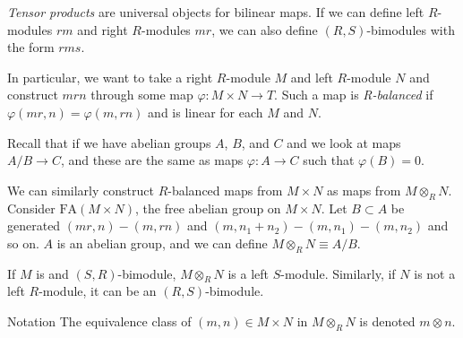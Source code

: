 \documentclass[a4paper,twoside,master.tex]{subfiles}
\begin{document}

\begin{definition}
    \textit{Tensor products} are universal objects for bilinear maps. If we can define left $ R $-modules $ rm $ and right $ R $-modules $ mr $, we can also define $ (R,S) $-bimodules with the form $ rms $.

    In particular, we want to take a right $ R $-module $ M $ and left $ R $-module $ N $ and construct $ mrn $ through some map $ \varphi \colon M \times N \to T $. Such a map is \textit{R-balanced} if $ \varphi(mr,n) = \varphi(m,rn) $ and is linear for each $ M $ and $ N $.
\end{definition}

Recall that if we have abelian groups $ A $, $ B $, and $ C $ and we look at maps $ A/B \to C $, and these are the same as maps $ \varphi \colon A \to C $ such that $ \varphi(B) = 0 $.

We can similarly construct $ R $-balanced maps from $ M \times N $ as maps from $ M \otimes_R N $. Consider $ \text{FA}(M \times N) $, the free abelian group on $ M \times N $. Let $ B \subset A $ be generated $ (mr,n)-(m,rn) $ and $ (m,n_1+n_2)-(m,n_1)-(m,n_2) $ and so on. $ A $ is an abelian group, and we can define $ M\otimes_R N \equiv A/B $.

If $ M $ is and $ (S,R) $-bimodule, $ M\otimes_R N $ is a left $ S $-module. Similarly, if $ N $ is not a left $ R $-module, it can be an $ (R,S) $-bimodule.

\begin{note}{Notation}
    The equivalence class of $ (m,n) \in M \times N $ in $ M\otimes_R N $ is denoted $ m\otimes n $.
\end{note}
\end{document}
